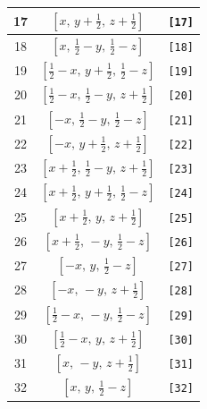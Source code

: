 \documentclass[fleqn,8pt]{jsarticle}
\begin{document}
\begin{longtable}{ccc}
17 & $\left[ x,\, y + \frac{1}{2},\, z + \frac{1}{2} \right]$ & {\tt [17]} \\ \hline
18 & $\left[ x,\, \frac{1}{2} - y,\, \frac{1}{2} - z \right]$ & {\tt [18]} \\ \hline
19 & $\left[ \frac{1}{2} - x,\, y + \frac{1}{2},\, \frac{1}{2} - z \right]$ & {\tt [19]} \\ \hline
20 & $\left[ \frac{1}{2} - x,\, \frac{1}{2} - y,\, z + \frac{1}{2} \right]$ & {\tt [20]} \\ \hline
21 & $\left[ - x,\, \frac{1}{2} - y,\, \frac{1}{2} - z \right]$ & {\tt [21]} \\ \hline
22 & $\left[ - x,\, y + \frac{1}{2},\, z + \frac{1}{2} \right]$ & {\tt [22]} \\ \hline
23 & $\left[ x + \frac{1}{2},\, \frac{1}{2} - y,\, z + \frac{1}{2} \right]$ & {\tt [23]} \\ \hline
24 & $\left[ x + \frac{1}{2},\, y + \frac{1}{2},\, \frac{1}{2} - z \right]$ & {\tt [24]} \\ \hline
25 & $\left[ x + \frac{1}{2},\, y,\, z + \frac{1}{2} \right]$ & {\tt [25]} \\ \hline
26 & $\left[ x + \frac{1}{2},\, - y,\, \frac{1}{2} - z \right]$ & {\tt [26]} \\ \hline
27 & $\left[ - x,\, y,\, \frac{1}{2} - z \right]$ & {\tt [27]} \\ \hline
28 & $\left[ - x,\, - y,\, z + \frac{1}{2} \right]$ & {\tt [28]} \\ \hline
29 & $\left[ \frac{1}{2} - x,\, - y,\, \frac{1}{2} - z \right]$ & {\tt [29]} \\ \hline
30 & $\left[ \frac{1}{2} - x,\, y,\, z + \frac{1}{2} \right]$ & {\tt [30]} \\ \hline
31 & $\left[ x,\, - y,\, z + \frac{1}{2} \right]$ & {\tt [31]} \\ \hline
32 & $\left[ x,\, y,\, \frac{1}{2} - z \right]$ & {\tt [32]} \\
\end{longtable}
\end{document}
